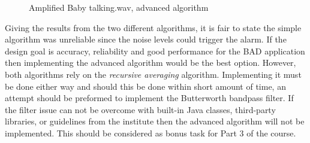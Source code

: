 \begin{figure}[H]
  \centering
  \caption{Amplified Baby talking.wav, advanced algorithm}
  \label{fig:bt_advn_amped}
\end{figure}

Giving the results from the two different algorithms, it is fair to state the simple algorithm was unreliable since the noise levels could 
trigger the alarm. If the design goal is accuracy, reliability and good performance for the BAD application
then implementing the advanced algorithm would be the best option. However, both algorithms rely on the \emph{recursive averaging} algorithm. 
Implementing it must be done either way and should this be done within short amount of time, an attempt should be preformed to implement the 
Butterworth bandpass filter. If the filter issue can not be overcome with built-in Java classes, third-party libraries, or guidelines 
from the institute then the advanced algorithm will not be implemented. This should be considered as bonus task for Part 3 of the course.
